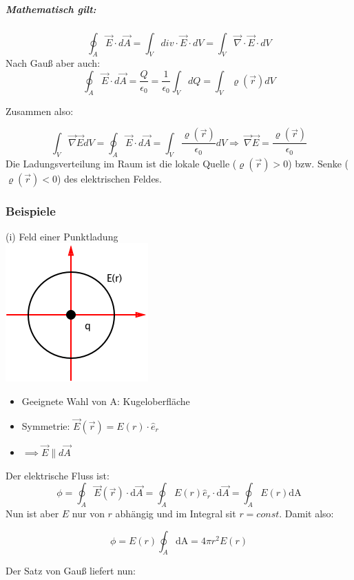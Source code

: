 \documentclass[11pt]{article}
\begin{document}
\subparagraph{Mathematisch gilt:}

$$\oint_{A}\vec{E}\cdot d\vec{A}=\int_{V} div\cdot \vec{E}\cdot dV=\int_{V}\vec{\nabla}\cdot\vec{E}\cdot dV$$
Nach Gau\ss{} aber auch:
$$\oint_{A}\vec{E}\cdot d\vec{A}=\frac{Q}{\epsilon_0}=\frac{1}{\epsilon_0}\int_VdQ=\int_V\varrho(\vec r)dV$$

Zusammen also:

$$\int_{V}\vec{\nabla}\vec{E}dV=\oint_{A}\vec{E}\cdot d\vec{A}=\int_{V}\frac{\varrho(\vec{r})}{\epsilon_0}dV
\Rightarrow\boxed{\ \vec{\nabla}\vec{E}=\frac{\varrho(\vec{r})}{\epsilon_0}}$$
Die Ladungsverteilung im Raum ist die lokale Quelle ($\varrho(\vec{r})>0$) bzw. Senke ($\varrho(\vec{r})<0$) des elektrischen Feldes.

\subsubsection{Beispiele}

(i) Feld einer Punktladung\\

\includegraphics{skizzen/14/14_6B2}\\

\begin{itemize}
	\item Geeignete Wahl von A: Kugeloberfläche
	\item Symmetrie: $\vec{E}(\vec{r})=E(r)\cdot\hat e_r$
	\item $\implies \vec{E}\parallel d\vec{A}$
\end{itemize}

	Der elektrische Fluss ist:
$$\phi=\oint_{A}\vec{E}(\vec{r})\cdot\mathrm{d}\vec{A}  = \oint_{A}E(r)\hat{e}_r\cdot\mathrm{d}\vec{A}=\oint_{A}E(r)\mathrm{dA}$$
Nun ist aber $E$ nur von $r$ abhängig und im Integral sit $r=const$. Damit also:

$$\phi	= E(r)\oint_{A}\mathrm{dA}= 4\pi r^2 E(r)$$

Der Satz von Gauß liefert nun:
\end{document}
